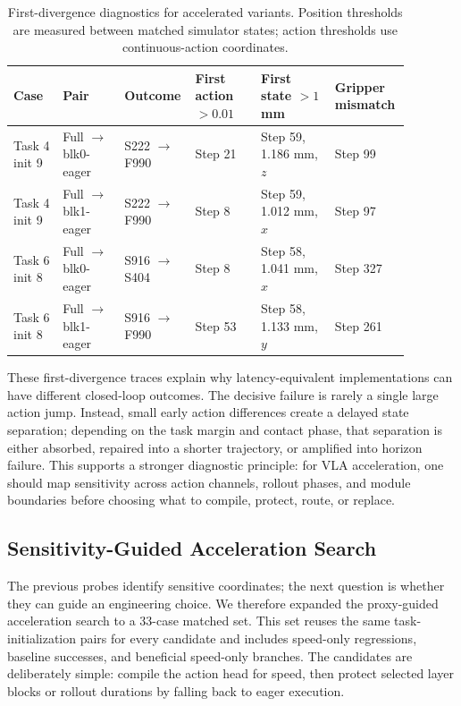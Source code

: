 \documentclass[10pt]{article}
\begin{document}
\begin{table}[H]
\centering
\scriptsize
\setlength{\tabcolsep}{2pt}
\caption{First-divergence diagnostics for accelerated variants. Position thresholds are measured between matched simulator states; action thresholds use continuous-action coordinates.}
\label{tab:first-divergence}
\begin{tabular}{p{0.12\linewidth}p{0.15\linewidth}p{0.13\linewidth}p{0.16\linewidth}p{0.18\linewidth}p{0.14\linewidth}}
\toprule
Case & Pair & Outcome & First action $>0.01$ & First state $>1$ mm & Gripper mismatch \\
\midrule
Task 4 init 9 & Full $\to$ blk0-eager & S222 $\to$ F990 & Step 21 & Step 59, 1.186 mm, $z$ & Step 99 \\
Task 4 init 9 & Full $\to$ blk1-eager & S222 $\to$ F990 & Step 8 & Step 59, 1.012 mm, $x$ & Step 97 \\
Task 6 init 8 & Full $\to$ blk0-eager & S916 $\to$ S404 & Step 8 & Step 58, 1.041 mm, $x$ & Step 327 \\
Task 6 init 8 & Full $\to$ blk1-eager & S916 $\to$ F990 & Step 53 & Step 58, 1.133 mm, $y$ & Step 261 \\
\bottomrule
\end{tabular}
\end{table}

These first-divergence traces explain why latency-equivalent implementations can have different closed-loop outcomes. The decisive failure is rarely a single large action jump. Instead, small early action differences create a delayed state separation; depending on the task margin and contact phase, that separation is either absorbed, repaired into a shorter trajectory, or amplified into horizon failure. This supports a stronger diagnostic principle: for VLA acceleration, one should map sensitivity across action channels, rollout phases, and module boundaries before choosing what to compile, protect, route, or replace.

\subsection{Sensitivity-Guided Acceleration Search}

The previous probes identify sensitive coordinates; the next question is whether they can guide an engineering choice. We therefore expanded the proxy-guided acceleration search to a 33-case matched set. This set reuses the same task-initialization pairs for every candidate and includes speed-only regressions, baseline successes, and beneficial speed-only branches. The candidates are deliberately simple: compile the action head for speed, then protect selected layer blocks or rollout durations by falling back to eager execution.
\end{document}
